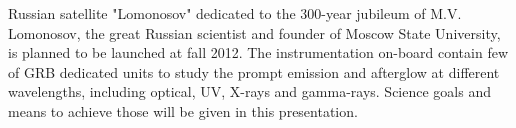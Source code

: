 


\bigskip



\bigskip

\noindent Russian satellite "Lomonosov" dedicated to the 300-year jubileum of M.V. Lomonosov, the great Russian scientist and founder of Moscow State University, is planned to be launched at fall 2012. The instrumentation on-board contain few of GRB dedicated units to study the prompt emission and afterglow at different wavelengths, including optical, UV, X-rays and gamma-rays. Science goals and means to achieve those will be given in this presentation.
